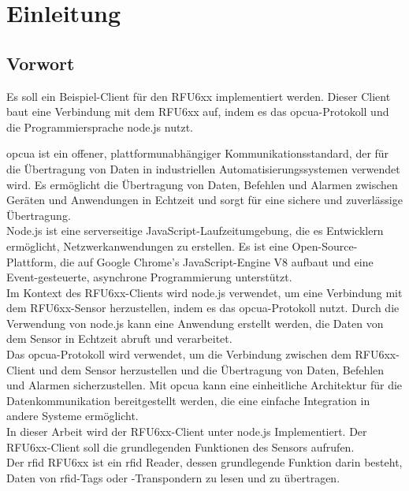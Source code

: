 

\chapter{Einleitung}
\section{Vorwort}
Es soll ein Beispiel-Client für den RFU6xx implementiert werden. Dieser Client baut eine Verbindung mit dem RFU6xx auf, indem es das \ac{opcua}-Protokoll und die Programmiersprache node.js nutzt.

\ac{opcua} ist ein offener, plattformunabhängiger Kommunikationsstandard, der für die Übertragung von Daten in industriellen Automatisierungssystemen verwendet wird. Es ermöglicht die Übertragung von Daten, Befehlen und Alarmen zwischen Geräten und Anwendungen in Echtzeit und sorgt für eine sichere und zuverlässige Übertragung.\\

Node.js ist eine serverseitige JavaScript-Laufzeitumgebung, die es Entwicklern ermöglicht, Netzwerkanwendungen zu erstellen. Es ist eine Open-Source-Plattform, die auf Google Chrome's JavaScript-Engine V8 aufbaut und eine Event-gesteuerte, asynchrone Programmierung unterstützt.\\
Im Kontext des RFU6xx-Clients wird node.js verwendet, um eine Verbindung mit dem RFU6xx-Sensor herzustellen, indem es das \ac{opcua}-Protokoll nutzt. Durch die Verwendung von node.js kann eine Anwendung erstellt werden, die Daten von dem Sensor in Echtzeit abruft und verarbeitet.\\

Das \ac{opcua}-Protokoll wird verwendet, um die Verbindung zwischen dem RFU6xx-Client und dem Sensor herzustellen und die Übertragung von Daten, Befehlen und Alarmen sicherzustellen. Mit \ac{opcua} kann eine einheitliche Architektur für die Datenkommunikation bereitgestellt werden, die eine einfache Integration in andere Systeme ermöglicht.\\

In dieser Arbeit wird der RFU6xx-Client unter node.js Implementiert. Der RFU6xx-Client soll die grundlegenden Funktionen des Sensors aufrufen.\\

Der \ac{rfid} RFU6xx ist ein \ac{rfid} Reader, dessen grundlegende Funktion darin besteht, Daten von \ac{rfid}-Tags oder -Transpondern zu lesen und zu übertragen.\\


